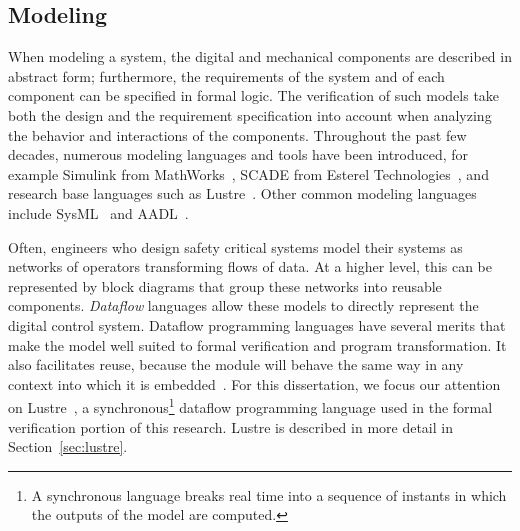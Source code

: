 \subsection{Modeling}
\label{sec:modeling}
When modeling a system, the digital and mechanical components are described in abstract form; furthermore, the requirements of the system and of each component can be specified in formal logic. The verification of such models take both the design and the requirement specification into account when analyzing the behavior and interactions of the components. Throughout the past few decades, numerous modeling languages and tools have been introduced, for example Simulink from MathWorks~\cite{MathWorks}, SCADE from Esterel Technologies~\cite{abdulla2004designing}, and research base languages such as Lustre~\cite{Halbwachs91:IEEE}. Other common modeling languages include SysML~\cite{friedenthal2014practical} and AADL~\cite{FeilerModelBasedEngineering2012}. 

Often, engineers who design safety critical systems model their systems as networks of operators transforming flows of data. At a higher level, this can be represented by block diagrams that group these networks into reusable components. {\em Dataflow} languages allow these models to directly represent the digital control system. Dataflow programming languages have several merits that make the model well suited to formal verification and program transformation. It also facilitates reuse, because the module will behave the same way in any context into which it is embedded~\cite{joshi2008behavioral}. For this dissertation, we focus our attention on Lustre~\cite{Halbwachs91:IEEE}, a synchronous\footnote{A synchronous language breaks real time into a sequence of instants in which the outputs of the model are computed.} dataflow programming language used in the formal verification portion of this research. Lustre is described in more detail in Section~\ref{sec:lustre}. 





